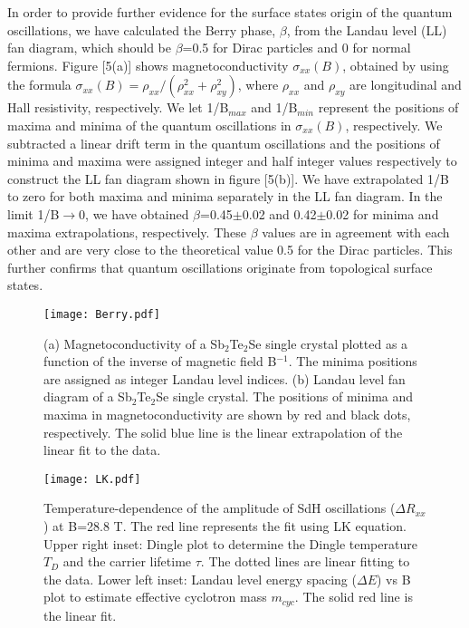 \documentclass[aps,prb,twocolumn,showpacs,groupedaddress]{revtex4-1}
\begin{document}
\indent In order to provide further evidence for the surface states origin of the quantum oscillations, we have calculated the Berry phase, $\beta$, from the Landau level (LL) fan diagram, which should be $\beta$=0.5 for Dirac particles and 0 for normal fermions. Figure [5(a)] shows magnetoconductivity $\sigma_{xx}(B)$, obtained by using the formula $\sigma_{xx}(B)=\rho_{xx}/(\rho_{xx}^{2}+\rho_{xy}^{2})$, where $\rho_{xx}$ and $\rho_{xy}$ are longitudinal and Hall resistivity, respectively. We let 1/B$_{max}$ and 1/B$_{min}$ represent the positions of maxima and minima of the quantum oscillations in $\sigma_{xx}(B)$, respectively. We subtracted a linear drift term in the quantum oscillations and the positions of minima and maxima were assigned integer and half integer values respectively to construct the LL fan diagram shown in figure [5(b)]. We have extrapolated 1/B to zero for both maxima and minima separately in the LL fan diagram. In the limit 1/B$\rightarrow$0, we have obtained $\beta$=0.45$\pm$0.02 and 0.42$\pm$0.02 for minima and maxima extrapolations, respectively. These $\beta$ values are in agreement with each other and are very close to the theoretical value 0.5 for the Dirac particles. This further confirms that quantum oscillations originate from topological surface states.\\
\begin{figure}
  \centering
  \texttt{[image: Berry.pdf]}
  \caption{(a) Magnetoconductivity of a Sb$_2$Te$_2$Se single crystal plotted as a function of the inverse of magnetic field B$^{-1}$. The minima positions are assigned as integer Landau level indices. (b) Landau level fan diagram of a Sb$_2$Te$_2$Se single crystal. The positions of minima and maxima in magnetoconductivity are shown by red and black dots, respectively. The solid blue line is the linear extrapolation of the linear fit to the data.}\label{Angle}
\end{figure}
\begin{figure}
  \centering
  \texttt{[image: LK.pdf]}
  \caption{Temperature-dependence of the amplitude of SdH oscillations ($\Delta R_{xx}$) at B=28.8 T. The red line represents the fit using LK equation\cite{Shoenberg:22}. Upper right inset: Dingle plot to determine the Dingle temperature $T_D$ and the carrier lifetime $\tau$. The dotted lines are linear fitting to the data. Lower left inset: Landau level energy spacing ($\Delta E$) vs B plot to estimate effective cyclotron mass $m_{cyc}$. The solid red line is the linear fit.}\label{LK}
\end{figure}
\end{document}
